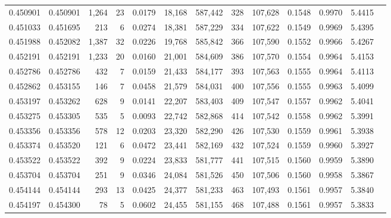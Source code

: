 \begin{tabular}{rrrrrrrrrrrrr}
0.450901 & 0.450901 & 1,264 &    23 &                                     0.0179 &  18,168 & 587,442 &     328 & 107,628 & 0.1548 & 0.9970 & 5.4415 \\
0.451033 & 0.451695 &   213 &     6 &                                     0.0274 &  18,381 & 587,229 &     334 & 107,622 & 0.1549 & 0.9969 & 5.4395 \\
0.451988 & 0.452082 & 1,387 &    32 &                                     0.0226 &  19,768 & 585,842 &     366 & 107,590 & 0.1552 & 0.9966 & 5.4267 \\
0.452191 & 0.452191 & 1,233 &    20 &                                     0.0160 &  21,001 & 584,609 &     386 & 107,570 & 0.1554 & 0.9964 & 5.4153 \\
0.452786 & 0.452786 &   432 &     7 &                                     0.0159 &  21,433 & 584,177 &     393 & 107,563 & 0.1555 & 0.9964 & 5.4113 \\
0.452862 & 0.453155 &   146 &     7 &                                     0.0458 &  21,579 & 584,031 &     400 & 107,556 & 0.1555 & 0.9963 & 5.4099 \\
0.453197 & 0.453262 &   628 &     9 &                                     0.0141 &  22,207 & 583,403 &     409 & 107,547 & 0.1557 & 0.9962 & 5.4041 \\
0.453275 & 0.453305 &   535 &     5 &                                     0.0093 &  22,742 & 582,868 &     414 & 107,542 & 0.1558 & 0.9962 & 5.3991 \\
0.453356 & 0.453356 &   578 &    12 &                                     0.0203 &  23,320 & 582,290 &     426 & 107,530 & 0.1559 & 0.9961 & 5.3938 \\
0.453374 & 0.453520 &   121 &     6 &                                     0.0472 &  23,441 & 582,169 &     432 & 107,524 & 0.1559 & 0.9960 & 5.3927 \\
0.453522 & 0.453522 &   392 &     9 &                                     0.0224 &  23,833 & 581,777 &     441 & 107,515 & 0.1560 & 0.9959 & 5.3890 \\
0.453704 & 0.453704 &   251 &     9 &                                     0.0346 &  24,084 & 581,526 &     450 & 107,506 & 0.1560 & 0.9958 & 5.3867 \\
0.454144 & 0.454144 &   293 &    13 &                                     0.0425 &  24,377 & 581,233 &     463 & 107,493 & 0.1561 & 0.9957 & 5.3840 \\
0.454197 & 0.454300 &    78 &     5 &                                     0.0602 &  24,455 & 581,155 &     468 & 107,488 & 0.1561 & 0.9957 & 5.3833 \\

\end{tabular}
